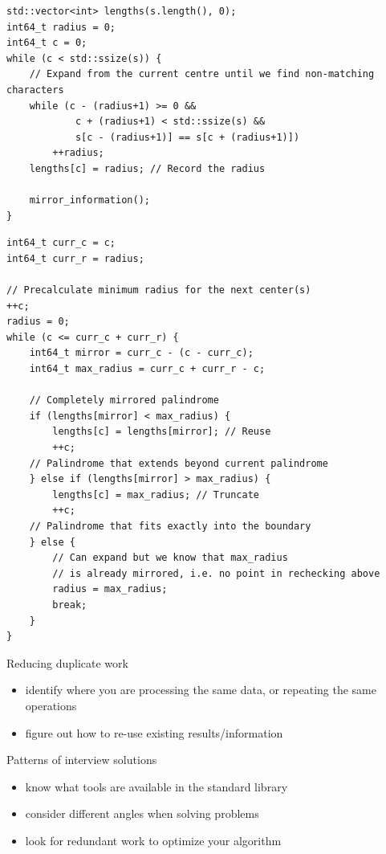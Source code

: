 \documentclass[aspectratio=169]{beamer}
\begin{document}
\begin{frame}[fragile]{}
\begin{verbatim}
std::vector<int> lengths(s.length(), 0);
int64_t radius = 0;
int64_t c = 0;
while (c < std::ssize(s)) {
    // Expand from the current centre until we find non-matching characters
    while (c - (radius+1) >= 0 && 
            c + (radius+1) < std::ssize(s) && 
            s[c - (radius+1)] == s[c + (radius+1)])
        ++radius;
    lengths[c] = radius; // Record the radius

    mirror_information();
}
\end{verbatim}
\end{frame}

\begin{frame}[fragile]{}
\scriptsize
\begin{verbatim}
int64_t curr_c = c;
int64_t curr_r = radius;

// Precalculate minimum radius for the next center(s)
++c;
radius = 0;
while (c <= curr_c + curr_r) {
    int64_t mirror = curr_c - (c - curr_c);
    int64_t max_radius = curr_c + curr_r - c;

    // Completely mirrored palindrome
    if (lengths[mirror] < max_radius) {
        lengths[c] = lengths[mirror]; // Reuse
        ++c;
    // Palindrome that extends beyond current palindrome
    } else if (lengths[mirror] > max_radius) {
        lengths[c] = max_radius; // Truncate
        ++c;
    // Palindrome that fits exactly into the boundary
    } else {
        // Can expand but we know that max_radius
        // is already mirrored, i.e. no point in rechecking above
        radius = max_radius;
        break;
    }
}
\end{verbatim}
\end{frame}

\begin{frame}{Reducing duplicate work}
  \begin{itemize}
      \item identify where you are processing the same data, or repeating the same operations
      \item figure out how to re-use existing results/information
  \end{itemize}
\end{frame}

\begin{frame}{Patterns of interview solutions}
  \begin{itemize}
    \item know what tools are available in the standard library
    \item consider different angles when solving problems
    \item look for redundant work to optimize your algorithm
  \end{itemize}
\end{frame}
\end{document}
